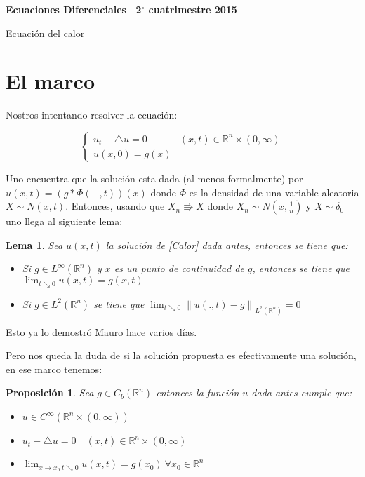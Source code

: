 \documentclass[11pt]{article}
\newcommand{\R}{{\mathbb{R}}}
\newcommand\norm[1]{\left\lVert#1\right\rVert}
\newtheorem{lemma}[theorem]{Lema}
\newtheorem{proposition}[theorem]{Proposici\'on}
\newenvironment{proof}[1][Demostraci\'on]{\begin{trivlist}
\item[\hskip \labelsep {\bfseries #1}]}{\end{trivlist}}
\begin{document}
\pagestyle{empty}
\pagestyle{fancy}
\fancyfoot[CO]{\slshape \thepage}
\renewcommand{\headrulewidth}{0pt}


\centerline{\bf Ecuaciones Diferenciales-- 2$^\circ$
cuatrimestre 2015}
\centerline{\sc Ecuaci\'on del calor}

\bigskip

\section{El marco}

Nostros intentando resolver la ecuaci\'on:

\begin{equation}
\label{Calor}
{
	\left\{
		\begin{array}{ll}
			u_t -  \triangle u = 0 & (x,t) \in \R^n \times (0,\infty) \\
			u(x,0)=g(x) & 
		\end{array}
	\right.
}
\end{equation}

Uno encuentra que la soluci\'on esta dada (al menos formalmente) por $u(x,t)=(g \ast \Phi(-,t))(x)$ donde $\Phi$ es la densidad de una variable aleatoria $X \sim N(x,t)$. Entonces, usando que $X_n \Rrightarrow X$ donde $X_n \sim N(x,\frac{1}{n})$ y $X \sim \delta_0$ uno llega al siguiente lema:

\begin{lemma}
Sea $u(x,t)$ la soluci\'on de \ref{Calor} dada antes, entonces se tiene que:
\begin{itemize}
\item Si $g \in L^{\infty}(\R^n)$ y $x$ es un punto de continuidad de $g$, entonces se tiene que $\lim_{t \searrow 0}{u(x,t)} = g(x,t)$
\item Si $g \in L^2(\R^n)$ se tiene que $\lim_{t \searrow 0}{\norm{u(.,t) - g}_{L^2(\R^n)}} = 0$
\end{itemize}
\end{lemma}

\begin{proof}
Esto ya lo demostr\'o Mauro hace varios d\'ias.
\end{proof}

Pero nos queda la duda de si la soluci\'on propuesta es efectivamente una soluci\'on, en ese marco tenemos:

\begin{proposition}
\label{Solucion homogeneo}
Sea $g \in C_b(\R^n)$ entonces la funci\'on $u$ dada antes cumple que:
\begin{itemize}
\item $u \in C^{\infty}(\R^n \times (0,\infty))$
\item  $u_t -  \triangle u = 0 \quad (x,t) \in \R^n \times (0,\infty) $
\item $\lim_{x \rightarrow x_0 \ t \searrow 0}{u(x,t)}=g(x_0) \ \forall x_0 \in \R^n$
\end{itemize}
\end{proposition}
\end{document}
